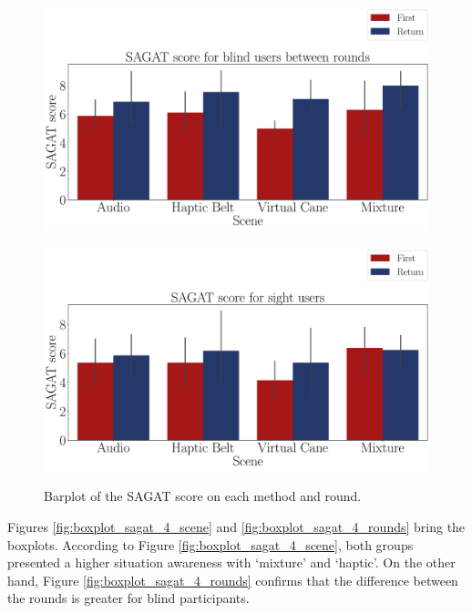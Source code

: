 \begin{figure}[!htb]
    \centering
    \begin{minipage}{\textwidth}
        \centering
        \includegraphics[width = \textwidth]{Resultados/Sagat/Figuras/pdf/barplot_sagat_avg_4_scene_blind.pdf}
        \label{fig:barplot_sagat_avg_4_scene_blind}
    \end{minipage}
    \begin{minipage}{\textwidth}
        \centering
        \includegraphics[width = \textwidth]{Resultados/Sagat/Figuras/pdf/barplot_sagat_avg_4_scene_sight.pdf}
        \label{fig:barplot_sagat_avg_4_scene_sight}
    \end{minipage}
    \caption{Barplot of the SAGAT score on each method and round.}
    \label{fig:barplot_sagat_avg_4_scene_blind_sight}
\end{figure}

Figures \ref{fig:boxplot_sagat_4_scene} and \ref{fig:boxplot_sagat_4_rounds} bring the boxplots. According to Figure \ref{fig:boxplot_sagat_4_scene}, both groups presented a higher situation awareness with ‘mixture’ and ‘haptic’. On the other hand, Figure \ref{fig:boxplot_sagat_4_rounds} confirms that the difference between the rounds is greater for blind participants. 

